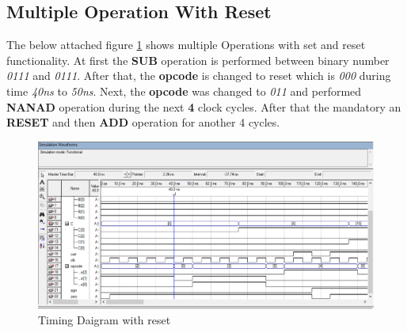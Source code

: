 \subsection{Multiple Operation With Reset}\label{subsec:multiple-operation-with-reset}
The below attached figure \ref{fig:multiple operation} shows multiple Operations with set and reset functionality.
At first the \textbf{SUB} operation is performed between binary number \textit{0111} and \textit{0111}.
After that, the \textbf{opcode} is changed to reset which is \textit{000} during time \textit{40ns} to \textit{50ns}.
Next, the \textbf{opcode} was changed to \textit{011} and performed \textbf{NANAD} operation during the next \textbf{4} clock cycles.
After that the mandatory an \textbf{RESET} and then \textbf{ADD} operation for another 4 cycles.
\begin{figure}[H]
    \begin{center}
        \includegraphics[scale=0.18]{figures/three_operation_together_sub_nand_add_with_reset}
    \end{center}
    \caption{Timing Daigram with reset}
    \label{fig:multiple operation}
\end{figure}

